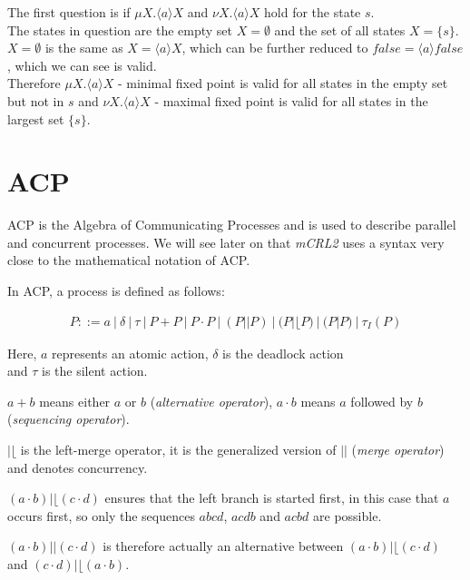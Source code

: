 \documentclass{clseminar}
\begin{document}
  \begin{example}
    The first question is if $\mu X. \langle a \rangle X$ and $\nu X. \langle a \rangle X$ hold for the state $s$. \\
    The states in question are the empty set $X = \emptyset$ and the set of all states $X = \{s\}$. \\
    $X = \emptyset$ is the same as $X = \langle a \rangle X$, which can be further reduced to $\mathit{false} = \langle a \rangle \mathit{false}$, which we can see is valid. \\
    Therefore $\mu X. \langle a \rangle X$ - minimal fixed point is valid for all states in the empty set but not in $s$ and $\nu X. \langle a \rangle X$ - maximal fixed point is valid for all states in the largest set $\{s\}$.
  \end{example}

  \section{ACP}

  ACP is the Algebra of Communicating Processes and is used to describe parallel and concurrent processes. We will see later on that \textit{mCRL2} uses a syntax very close to the mathematical notation of ACP.

  In ACP, a process is defined \cite{acp_wiki} as follows:

  \begin{align*}
    P ::= a\ |\ \delta\ |\ \tau\ |\ P + P\ |\ P \cdot P\ |\ (P || P)\ |\ (P |\lfloor P)\ |\ (P | P)\ |\ \tau_I(P)
  \end{align*}

  Here, $a$ represents an atomic action, $\delta$ is the deadlock action \\ and $\tau$ is the silent action.

  $a + b$ means either $a$ or $b$ (\textit{alternative operator}), $a \cdot b$ means $a$ followed by $b$ (\textit{sequencing operator}).

  $|\lfloor$ is the left-merge operator, it is the generalized version of $||$ (\textit{merge operator}) and denotes concurrency.
  \\
  \begin{example}
    $(a \cdot b) |\lfloor (c \cdot d)$ ensures that the left branch is started first, in this case that $a$ occurs first, so only the sequences $abcd$, $acdb$ and $acbd$ are possible.

    $(a \cdot b) || (c \cdot d)$ is therefore actually an alternative between $(a \cdot b) |\lfloor (c \cdot d)$ and $(c \cdot d) |\lfloor (a \cdot b)$.
  \end{example}
\end{document}
